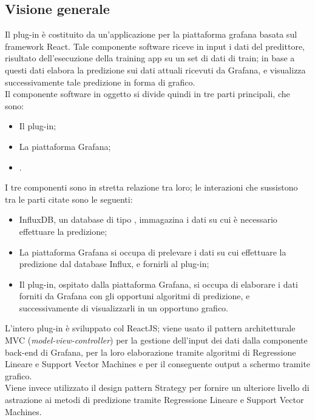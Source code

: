 \documentclass[../manuale-sviluppatore.tex]{subfiles}
\begin{document}
\subsection{Visione generale}
Il plug-in è costituito da un'applicazione per la piattaforma grafana basata sul framework React. Tale componente software riceve in input i dati del predittore, risultato dell'esecuzione della training app su un set di dati di train; in base a questi dati elabora la predizione sui dati attuali ricevuti da Grafana, e visualizza successivamente tale predizione in forma di grafico. \\
Il componente software in oggetto si divide quindi in tre parti principali, che sono:
\begin{itemize}
  \item Il plug-in;
  \item La piattaforma Grafana;
  \item {}.
\end{itemize}

I tre componenti sono in stretta relazione tra loro; le interazioni che sussistono tra le parti citate sono le seguenti:
\begin{itemize}
  \item InfluxDB, un database di tipo , immagazina i dati su cui è necessario effettuare la predizione;
  \item La piattaforma Grafana si occupa di prelevare i dati su cui effettuare la predizione dal database Influx, e fornirli al plug-in;
  \item Il plug-in, ospitato dalla piattaforma Grafana, si occupa di elaborare i dati forniti da Grafana con gli opportuni algoritmi di predizione, e successivamente di visualizzarli in un opportuno grafico.
\end{itemize}

L'intero plug-in è sviluppato col  ReactJS; viene usato il pattern architetturale MVC (\textit{model-view-controller}) per la gestione dell'input dei dati dalla componente back-end di Grafana, per la loro elaborazione tramite algoritmi di Regressione Lineare e Support Vector Machines e per il conseguente output a schermo tramite grafico. \\
Viene invece utilizzato il design pattern Strategy per fornire un ulteriore livello di astrazione ai metodi di predizione tramite Regressione Lineare e Support Vector Machines.
\end{document}
